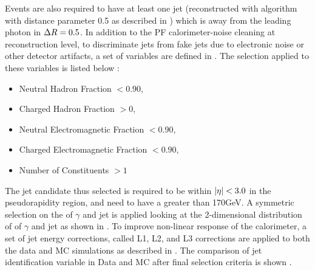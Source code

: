 Events are also required to have at least one jet (reconstructed with \antikt algorithm with distance parameter 0.5 as described in 
\sectn{\ref{Se:Jet}}) which is away from the leading photon in $\Delta{R}=0.5$. In addition to the PF calorimeter-noise cleaning at 
reconstruction level, to discriminate jets from fake jets due to electronic noise or other detector artifacts, a set of variables are 
defined in \sectn{\ref{Se:JetID}}. The selection applied to these variables is listed below :
\begin{itemize}
\item Neutral Hadron  Fraction $<0.90$,
\item Charged Hadron  Fraction $>0$, 
\item Neutral Electromagnetic Fraction $<0.90$,
\item Charged Electromagnetic Fraction $<0.90$,
\item Number of Constituents $>1$
\end{itemize}
The jet candidate thus selected is required to be within $\lvert \eta \rvert<3.0$ in the pseudorapidity region, and need to have a \pt greater than
170\unit{GeV}. A symmetric selection on the \pt of $\gamma$ and jet is applied looking at the 2-dimensional distribution of \pt of $\gamma$
and jet as shown in \fig{\ref{fig:ptPhotonJet}}. To improve non-linear response of the calorimeter, a set of jet energy corrections, called L1, 
L2, and L3 corrections are applied to both the data and MC simulations as described in \sectn{\ref{Se:Jec}}. The comparison of jet identification 
variable in Data and MC after final selection criteria is shown \fig{\ref{fig:JetID}}.
%
